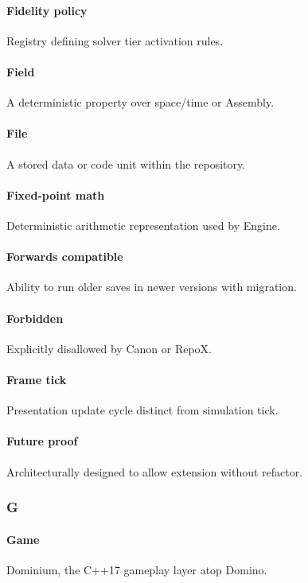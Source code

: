 \documentclass[9pt,a4paper,openany]{book}
\begin{document}
\paragraph{Fidelity policy}
Registry defining solver tier activation rules.\allowbreak{}


\paragraph{Field}
A deterministic property over space/\allowbreak{}time or Assembly.\allowbreak{}


\paragraph{File}
A stored data or code unit within the repository.\allowbreak{}


\paragraph{Fixed-point math}
Deterministic arithmetic representation used by Engine.\allowbreak{}


\paragraph{Forwards compatible}
Ability to run older saves in newer versions with migration.\allowbreak{}


\paragraph{Forbidden}
Explicitly disallowed by Canon or RepoX.\allowbreak{}


\paragraph{Frame tick}
Presentation update cycle distinct from simulation tick.\allowbreak{}


\paragraph{Future proof}
Architecturally designed to allow extension without refactor.\allowbreak{}


\subsubsection{G}

\paragraph{Game}
Dominium, the C++17 gameplay layer atop Domino.\allowbreak{}
\end{document}
